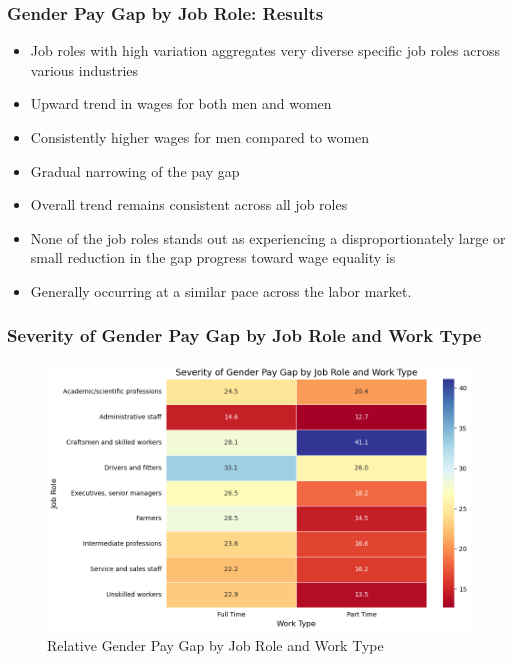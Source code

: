 \documentclass{beamer}
\begin{document}
\begin{frame}
\frametitle{Gender Pay Gap by Job Role: Results}
\begin{center}
  \begin{itemize}
    \item Job roles with high variation aggregates very diverse specific job roles across
various industries
    \item Upward trend in wages for both men and women
    \item Consistently higher wages for men compared to women
    \item Gradual narrowing of the pay gap
    \item Overall trend remains consistent across all job roles
    \item None of the job roles stands out as experiencing a disproportionately large or small reduction in the gap progress toward wage equality is
    \item Generally occurring at a similar pace across the labor market.
\end{itemize} 
\end{center}
\end{frame}


\begin{frame}
\frametitle{Severity of Gender Pay Gap by Job Role and Work Type}
\begin{center}
\begin{figure}[H]
    \includegraphics[width=\textwidth]{Figures/Severity_of_Pay_Gap_by_Role_and_Work_Type.png}
    \caption{Relative Gender Pay Gap by Job Role and Work Type}
    \label{fig:heatmap}
\end{figure}
\end{center}
\end{frame}
\end{document}
